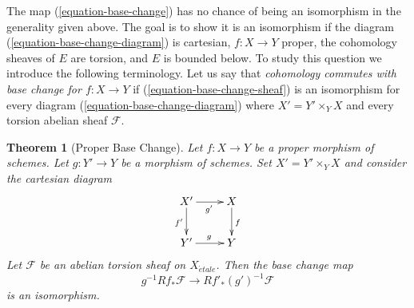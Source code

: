 \documentclass{amsart}
\theoremstyle{plain}
\newtheorem{theorem}[subsection]{Theorem}
\theoremstyle{definition}
\theoremstyle{remark}
\numberwithin{equation}{subsection}
\def\etale{{\acute{e}tale}}
\begin{document}
\medskip\noindent
The map (\ref{equation-base-change}) has no chance of being an isomorphism
in the generality given above. The goal is to show
it is an isomorphism if the diagram (\ref{equation-base-change-diagram})
is cartesian, $f : X \to Y$ proper, the cohomology sheaves of $E$
are torsion, and $E$ is bounded below.
To study this question we introduce the following terminology.
Let us say that {\it cohomology commutes with base change
for $f : X \to Y$} if (\ref{equation-base-change-sheaf})
is an isomorphism for every diagram (\ref{equation-base-change-diagram})
where $X' = Y' \times_Y X$ and every torsion abelian sheaf $\mathcal{F}$.


\begin{theorem}[Proper Base Change]
\label{theorem-proper-base-change}
Let $f : X \to Y$ be a proper morphism of schemes. Let $g : Y' \to Y$ be
a morphism of schemes. Set $X' = Y' \times_Y X$
and consider the cartesian diagram
$$
\xymatrix{
X' \ar[r]_{g'} \ar[d]_{f'} & X \ar[d]^f \\
Y' \ar[r]^g & Y
}
$$
Let $\mathcal{F}$ be an abelian torsion sheaf on $X_\etale$.
Then the base change map
$$
g^{-1}Rf_*\mathcal{F} \longrightarrow Rf'_*(g')^{-1}\mathcal{F}
$$
is an isomorphism.
\end{theorem}
\end{document}
